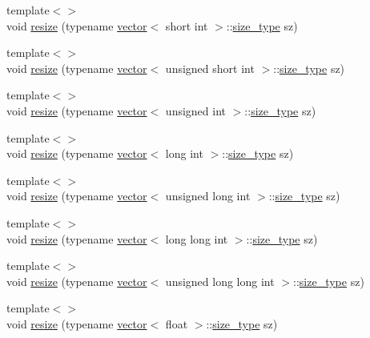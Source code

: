 \begin{DoxyCompactItemize}
\item 
{\footnotesize template$<$$>$ }\\void \mbox{\hyperlink{classvector_a2fde9874a283682165fc447e6d391303}{resize}} (typename \mbox{\hyperlink{classvector}{vector}}$<$ short int $>$\+::\mbox{\hyperlink{classvector_ada51e68d31936547d3729c82daf6b7c6}{size\+\_\+type}} sz)
\item 
{\footnotesize template$<$$>$ }\\void \mbox{\hyperlink{classvector_aa4dc0d181139e13d1fb0d49e4ebb6118}{resize}} (typename \mbox{\hyperlink{classvector}{vector}}$<$ unsigned short int $>$\+::\mbox{\hyperlink{classvector_ada51e68d31936547d3729c82daf6b7c6}{size\+\_\+type}} sz)
\item 
{\footnotesize template$<$$>$ }\\void \mbox{\hyperlink{classvector_a98f4544783daacd3587f81633c411cef}{resize}} (typename \mbox{\hyperlink{classvector}{vector}}$<$ unsigned int $>$\+::\mbox{\hyperlink{classvector_ada51e68d31936547d3729c82daf6b7c6}{size\+\_\+type}} sz)
\item 
{\footnotesize template$<$$>$ }\\void \mbox{\hyperlink{classvector_a144b6f26b64a01d9068a41030b6d70b9}{resize}} (typename \mbox{\hyperlink{classvector}{vector}}$<$ long int $>$\+::\mbox{\hyperlink{classvector_ada51e68d31936547d3729c82daf6b7c6}{size\+\_\+type}} sz)
\item 
{\footnotesize template$<$$>$ }\\void \mbox{\hyperlink{classvector_a7b1fc7fc6063e5abe6344b2444b1639b}{resize}} (typename \mbox{\hyperlink{classvector}{vector}}$<$ unsigned long int $>$\+::\mbox{\hyperlink{classvector_ada51e68d31936547d3729c82daf6b7c6}{size\+\_\+type}} sz)
\item 
{\footnotesize template$<$$>$ }\\void \mbox{\hyperlink{classvector_ad0bd6c2779c3072230348803f8ab2343}{resize}} (typename \mbox{\hyperlink{classvector}{vector}}$<$ long long int $>$\+::\mbox{\hyperlink{classvector_ada51e68d31936547d3729c82daf6b7c6}{size\+\_\+type}} sz)
\item 
{\footnotesize template$<$$>$ }\\void \mbox{\hyperlink{classvector_aaaecd78c7a4a6e2efde0db578d3fc1ea}{resize}} (typename \mbox{\hyperlink{classvector}{vector}}$<$ unsigned long long int $>$\+::\mbox{\hyperlink{classvector_ada51e68d31936547d3729c82daf6b7c6}{size\+\_\+type}} sz)
\item 
{\footnotesize template$<$$>$ }\\void \mbox{\hyperlink{classvector_a3793ffddf2ce15944e7dd51db8a463a3}{resize}} (typename \mbox{\hyperlink{classvector}{vector}}$<$ float $>$\+::\mbox{\hyperlink{classvector_ada51e68d31936547d3729c82daf6b7c6}{size\+\_\+type}} sz)

\end{DoxyCompactItemize}
